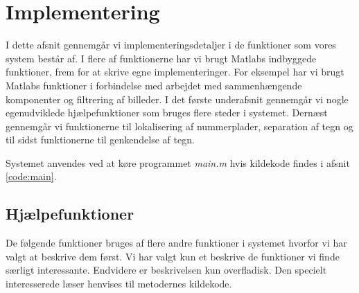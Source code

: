 \section{Implementering}
\label{sec:implementation}

I dette afsnit gennemgår vi implementeringsdetaljer i de funktioner som vores system består af. I flere af funktionerne har vi brugt Matlabs indbyggede funktioner, frem for at skrive egne implementeringer. For eksempel har vi brugt Matlabs funktioner i forbindelse med arbejdet med sammenhængende komponenter og filtrering af billeder. I det første underafsnit gennemgår vi nogle egenudviklede hjælpefunktioner som bruges flere steder i systemet. Dernæst gennemgår vi funktionerne til lokalisering af nummerplader, separation af tegn og til sidst funktionerne til genkendelse af tegn.

Systemet anvendes ved at køre programmet \textit{main.m} hvis kildekode findes i afsnit \vref{code:main}.




\subsection{Hjælpefunktioner}
\label{sec:imp:hjaelpefunktioner}
De følgende funktioner bruges af flere andre funktioner i systemet hvorfor vi har valgt at beskrive dem først. Vi har valgt kun et beskrive de funktioner vi finde særligt interessante. Endvidere er beskrivelsen kun overfladisk. Den specielt interesserede læser henvises til metodernes kildekode.

